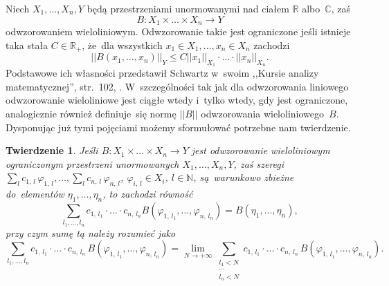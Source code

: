 \documentclass[a4paper,11pt]{article}
\newtheorem{twr}{Twierdzenie}
\newcommand{\ld}{\ldots}
\newcommand{\mb}{\mathbb}
\newcommand{\ra}{\rightarrow}
\newcommand{\wtw}{wtedy i~tylko wtedy}
\newcommand{\vp}{\varphi}
\newcommand{\N}{\mb{N}}
\newcommand{\R}{\mb{R}}
\newcommand{\C}{\mb{C}}
\newcommand{\Rp}{\R_{ + }}
\newcommand{\ti}{\times}
\newcommand{\Lim}{\lim\limits}
\newcommand{\Sum}{\sum\limits}
\newcommand{\norm}[1]{\left|\left| #1 \right|\right|}
\begin{document}
Niech $X_{ 1 }, \ld, X_{ n }, Y$ będą przestrzeniami unormowanymi nad
ciałem $\R$ albo~$\C$, zaś
\begin{equation*}
  B: X_{ 1 } \ti \ld \ti X_{ n } \ra Y
\end{equation*}
odwzorowaniem wieloliniowym. Odwzorowanie takie jest ograniczone jeśli
istnieje taka stała $C \in \Rp$, że~dla wszystkich
$x_{ 1 } \in X_{ 1 }, \ld, x_{ n } \in X_{ n }$ zachodzi
\begin{equation}
  \norm{ B( x_{ 1 }, \ld, x_{ n } ) }_{ Y } \leq C
  \norm{ x_{ 1 } }_{ X_{ 1 } } \cdot \ld \cdot \norm{ x_{ n } }_{ X_{ n } }.
\end{equation}
Podstawowe ich własności przedstawił Schwartz w~swoim ,,Kursie analizy
matematycznej'', str.~102, \cite{Sch79}. W~szczególności tak jak dla
odwzorowania liniowego odwzorowanie wieloliniowe jest ciągłe \wtw, gdy
jest ograniczone, analogicznie również definiuje~się normę
$\norm{ B }$ odwzorowania wieloliniowego~$B$. Dysponując już tymi
pojęciami możemy sformułować potrzebne nam twierdzenie.

\begin{twr}
  Jeśli $B: X_{ 1 } \ti \ld \ti X_{ n } \ra Y$ jest odwzorowanie
  wieloliniowym ograniczonym przestrzeni unormowanych
  $X_{ 1 }, \ld, X_{ n }, Y$, zaś szeregi
  $\sum_{ l } c_{ 1, \, l } \, \vp_{ 1, \, l }, \ld, \sum_{ l } c_{ n,
    \, l } \, \vp_{ n, \, l }$, $\vp_{ i, \, l } \in X_{ i }$,
  $l \in \N$, są~warunkowo zbieżne do~elementów
  $\eta_{ 1 }, \ld, \eta_{ n }$, to zachodzi równość
  \begin{equation*}
    \Sum_{ l_{ 1 }, \ld, l_{ n } } c_{ 1, \, l_{ 1 } } \cdot \ld \cdot
    c_{ n, \, l_{ n } } B( \vp_{ 1, \, l_{ 1 } }, \ld,
    \vp_{ n, \, l_{ n } } ) = B( \eta_{ 1 }, \ld, \eta_{ n } ),
  \end{equation*}
  przy czym sumę tą należy rozumieć jako
  \begin{equation*}
    \Sum_{ l_{ 1 }, \ld, l_{ n } } c_{ 1, \, l_{ 1 } } \cdot \ld \cdot
    c_{ n, \, l_{ n } } \, B( \vp_{ 1, \, l_{ 1 } }, \ld,
    \vp_{ n, \, l_{ n } } ) = \Lim_{ N \ra +\infty }
    \Sum_{ \substack{ l_{ 1 } < N \\ \cdots \\ l_{ n } < N } }
    c_{ 1, \, l_{ 1 } } \cdot \ld \cdot c_{ n, \, l_{ n } } \,
    B( \vp_{ 1, \, l_{ 1 } }, \ld, \vp_{ n, \, l_{ n } } ).
  \end{equation*}
\end{twr}
\end{document}
